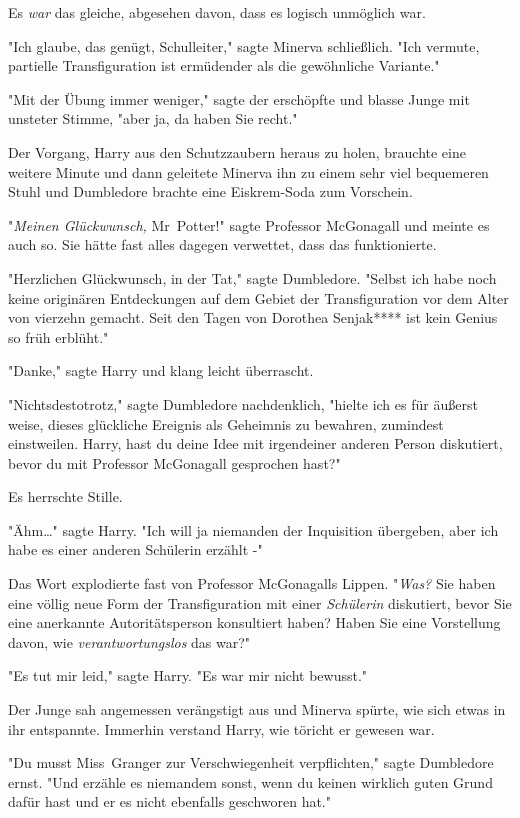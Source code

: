 {Es \emph{war} das gleiche, abgesehen davon, dass es logisch unmöglich war.

"Ich glaube, das genügt, Schulleiter," sagte Minerva schließlich. "Ich vermute, partielle Transfiguration ist ermüdender als die gewöhnliche Variante."

"Mit der Übung immer weniger," sagte der erschöpfte und blasse Junge mit unsteter Stimme, "aber ja, da haben Sie recht."

Der Vorgang, Harry aus den Schutzzaubern heraus zu holen, brauchte eine weitere Minute und dann geleitete Minerva ihn zu einem sehr viel bequemeren Stuhl und Dumbledore brachte eine Eiskrem-Soda zum Vorschein.

"\emph{Meinen Glückwunsch,} Mr~Potter!" sagte Professor McGonagall und meinte es auch so. Sie hätte fast alles dagegen verwettet, dass das funktionierte.

"Herzlichen Glückwunsch, in der Tat," sagte Dumbledore. "Selbst ich habe noch keine originären Entdeckungen auf dem Gebiet der Transfiguration vor dem Alter von vierzehn gemacht. Seit den Tagen von Dorothea Senjak**** ist kein Genius so früh erblüht."

"Danke," sagte Harry und klang leicht überrascht.

"Nichtsdestotrotz," sagte Dumbledore nachdenklich, "hielte ich es für äußerst weise, dieses glückliche Ereignis als Geheimnis zu bewahren, zumindest einstweilen. Harry, hast du deine Idee mit irgendeiner anderen Person diskutiert, bevor du mit Professor McGonagall gesprochen hast?"

Es herrschte Stille.

"Ähm…" sagte Harry. "Ich will ja niemanden der Inquisition übergeben, aber ich habe es einer anderen Schülerin erzählt -"

Das Wort explodierte fast von Professor McGonagalls Lippen. "\emph{Was?} Sie haben eine völlig neue Form der Transfiguration mit einer \emph{Schülerin} diskutiert, bevor Sie eine anerkannte Autoritätsperson konsultiert haben? Haben Sie eine Vorstellung davon, wie \emph{verantwortungslos} das war?"

"Es tut mir leid," sagte Harry. "Es war mir nicht bewusst."

Der Junge sah angemessen verängstigt aus und Minerva spürte, wie sich etwas in ihr entspannte. Immerhin verstand Harry, wie töricht er gewesen war.

"Du musst Miss~Granger zur Verschwiegenheit verpflichten," sagte Dumbledore ernst. "Und erzähle es niemandem sonst, wenn du keinen wirklich guten Grund dafür hast und er es nicht ebenfalls geschworen hat."

}
